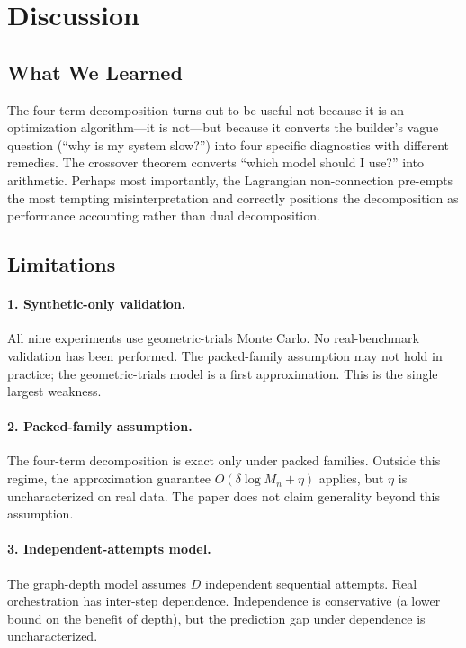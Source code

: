 \documentclass[twoside,11pt]{article}
\newcommand{\Mn}{M_n}
\begin{document}
\section{Discussion}
\label{sec:discussion}

\subsection{What We Learned}

The four-term decomposition turns out to be useful not because it is an optimization algorithm---it is not---but because it converts the builder's vague question (``why is my system slow?'') into four specific diagnostics with different remedies.
The crossover theorem converts ``which model should I use?'' into arithmetic.
Perhaps most importantly, the Lagrangian non-connection pre-empts the most tempting misinterpretation and correctly positions the decomposition as performance accounting rather than dual decomposition.

\subsection{Limitations}

\paragraph{1. Synthetic-only validation.}
All nine experiments use geometric-trials Monte Carlo.
No real-benchmark validation has been performed.
The packed-family assumption may not hold in practice; the geometric-trials model is a first approximation.
This is the single largest weakness.

\paragraph{2. Packed-family assumption.}
The four-term decomposition is exact only under packed families.
Outside this regime, the approximation guarantee $O(\delta \log \Mn + \eta)$ applies, but $\eta$ is uncharacterized on real data.
The paper does not claim generality beyond this assumption.

\paragraph{3. Independent-attempts model.}
The graph-depth model assumes $D$ independent sequential attempts.
Real orchestration has inter-step dependence.
Independence is conservative (a lower bound on the benefit of depth), but the prediction gap under dependence is uncharacterized.
\end{document}
